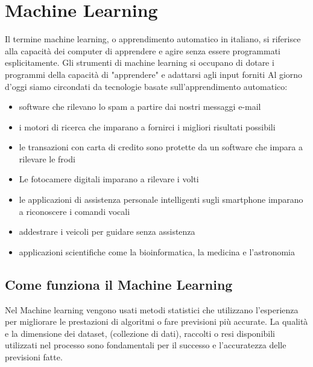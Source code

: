 \documentclass[12pt,italian]{report}
\begin{document}
\chapter{Machine Learning}
Il termine machine learning, o apprendimento automatico in italiano, si riferisce alla capacità dei computer di apprendere e agire senza essere programmati esplicitamente.
Gli strumenti di machine learning si occupano di dotare i programmi della capacità di "apprendere" e adattarsi agli input forniti
Al giorno d'oggi siamo circondati da tecnologie basate sull'apprendimento automatico:
\begin{itemize}
	\item software che rilevano lo spam a partire dai nostri messaggi e-mail  
	\item i motori di ricerca che imparano a fornirci i migliori risultati possibili
	\item le transazioni con carta di credito sono protette da un software che impara a rilevare le frodi
	\item Le fotocamere digitali imparano a rilevare i volti
	\item le applicazioni di assistenza personale intelligenti sugli smartphone imparano a riconoscere i comandi vocali
	\item addestrare i veicoli per guidare senza assistenza
	\item applicazioni scientifiche come la bioinformatica, la medicina e l'astronomia
\end{itemize}
\section{Come funziona il Machine Learning}
\label{sec:Come funziona il Machine Learning}
Nel Machine learning vengono usati metodi statistici che utilizzano l'esperienza per migliorare le prestazioni di algoritmi o fare previsioni più accurate.
La qualità e la dimensione dei dataset, (collezione di dati), raccolti o resi disponibili utilizzati nel processo sono fondamentali per il successo e l'accuratezza delle previsioni fatte.
\end{document}
